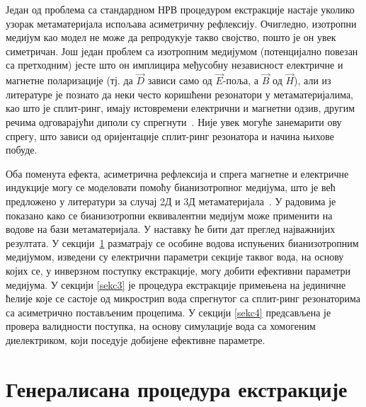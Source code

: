 \documentclass[main.tex]{subfiles}
\begin{document}
Један од проблема са стандардном НРВ процедуром екстракције настаје уколико узорак метаматеријала испољава асиметричну рефлексију. Очигледно, изотропни медијум као модел не може да репродукује такво својство, пошто је он увек симетричан. Још један проблем са изотропним медијумом (потенцијално повезан са претходним) јесте што он имплицира међусобну независност електричне и магнетне поларизације (тј. да $\vec{D}$ зависи само од $\vec{E}$-поља, а $\vec{B}$ од $\vec{H}$), али из литературе је познато да неки често коришћени резонатори у метаматеријалима, као што је сплит-ринг, имају истовремени електрични и магнетни одзив, другим речима одговарајући диполи су спрегнути~\cite{marques}. Није увек могуће занемарити ову спрегу, што зависи од оријентације сплит-ринг резонатора и начина њихове побуде.

Оба поменута ефекта, асиметрична рефлексија и спрега магнетне и електричне индукције могу се моделовати помоћу бианизотропног медијума, што је већ предложено у литератури за случај 2Д и 3Д метаматеријала~\cite{chen:05,kriegler,shalaev}. У радовима \cite{bian_mtt,bian_physcr} је показано како се бианизотропни еквивалентни медијум може применити на водове на бази метаматеријала. У наставку ће бити дат преглед најважнијих резултата. У секцији~\ref{sekc2} разматрају се особине водова испуњених бианизотропним медијумом, изведени су електрични параметри секције таквог вода, на основу којих се, у инверзном поступку екстракције, могу добити ефективни параметри медијума. У секцији \ref{sekc3} је процедура екстракције примењена на јединичне ћелије које се састоје од микрострип вода спрегнутог са сплит-ринг резонаторима са асиметрично постављеним процепима. У секцији \ref{sekc4} предсављена је провера валидности поступка, на основу симулације вода са хомогеним диелектриком, који поседује добијене ефективне параметре.


\section{Генералисана процедура екстракције}\label{sekc2}
\end{document}

